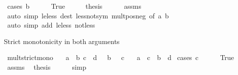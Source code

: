 \begin{isabellebody}
%
\isadelimproof
%
\endisadelimproof
%
\isatagproof
{}\isamarkupfalse%
\ {\isacharparenleft}{\kern0pt}cases\ {\isachardoublequoteopen}b\ {\isasymle}\ {}{\isachardoublequoteclose}{\isacharparenright}{\kern0pt}\isanewline
\ \ \isamarkupfalse%
\ True\isanewline
\ \ \isamarkupfalse%
\ \isamarkupfalse%
\ {\isacharquery}{\kern0pt}thesis\isanewline
\ \ \ \ \isamarkupfalse%
\ assms\ \isamarkupfalse%
\ {\isacharparenleft}{\kern0pt}auto\ simp{\isacharcolon}{\kern0pt}\ le{\isacharunderscore}{\kern0pt}less\ dest{\isacharcolon}{\kern0pt}\ less{\isacharunderscore}{\kern0pt}not{\isacharunderscore}{\kern0pt}sym\ mult{\isacharunderscore}{\kern0pt}pos{\isacharunderscore}{\kern0pt}neg{}\ {\isacharbrackleft}{\kern0pt}of\ a\ b{\isacharbrackright}{\kern0pt}{\isacharparenright}{\kern0pt}\isanewline
{}\isamarkupfalse%
\ {\isacharparenleft}{\kern0pt}auto\ simp\ add{\isacharcolon}{\kern0pt}\ le{\isacharunderscore}{\kern0pt}less\ not{\isacharunderscore}{\kern0pt}less{\isacharparenright}{\kern0pt}%
\endisatagproof
{\isafoldproof}%
%
\isadelimproof
%
\endisadelimproof
%
\begin{isamarkuptext}%
Strict monotonicity in both arguments%
\end{isamarkuptext}\isamarkuptrue%
\isamarkupfalse%
\ mult{\isacharunderscore}{\kern0pt}strict{\isacharunderscore}{\kern0pt}mono{\isacharcolon}{\kern0pt}\isanewline
\ \ \ {\isachardoublequoteopen}a\ {\isacharless}{\kern0pt}\ b{\isachardoublequoteclose}\ {\isachardoublequoteopen}c\ {\isacharless}{\kern0pt}\ d{\isachardoublequoteclose}\ {\isachardoublequoteopen}{}\ {\isacharless}{\kern0pt}\ b{\isachardoublequoteclose}\ {\isachardoublequoteopen}{}\ {\isasymle}\ c{\isachardoublequoteclose}\isanewline
\ \ \ {\isachardoublequoteopen}a\ {\isacharasterisk}{\kern0pt}\ c\ {\isacharless}{\kern0pt}\ b\ {\isacharasterisk}{\kern0pt}\ d{\isachardoublequoteclose}\isanewline
%
\isadelimproof
%
\endisadelimproof
%
\isatagproof
{}\isamarkupfalse%
\ {\isacharparenleft}{\kern0pt}cases\ {\isachardoublequoteopen}c\ {\isacharequal}{\kern0pt}\ {}{\isachardoublequoteclose}{\isacharparenright}{\kern0pt}\isanewline
\ \ \isamarkupfalse%
\ True\isanewline
\ \ \isamarkupfalse%
\ assms\ \isamarkupfalse%
\ {\isacharquery}{\kern0pt}thesis\isanewline
\ \ \ \ \isamarkupfalse%
\ simp\isanewline
{}\isamarkupfalse%

\end{isabellebody}
